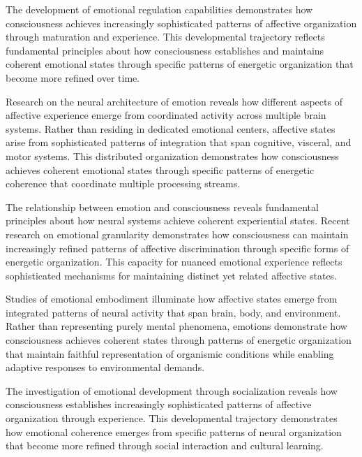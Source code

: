 The development of emotional regulation capabilities \cite{Siegel2012, amil2024theta} demonstrates how consciousness achieves increasingly sophisticated patterns of affective organization through maturation and experience. This developmental trajectory reflects fundamental principles about how consciousness establishes and maintains coherent emotional states through specific patterns of energetic organization that become more refined over time.

Research on the neural architecture of emotion \cite{Davidson2012, zheng2025unbearable} reveals how different aspects of affective experience emerge from coordinated activity across multiple brain systems. Rather than residing in dedicated emotional centers, affective states arise from sophisticated patterns of integration that span cognitive, visceral, and motor systems. This distributed organization demonstrates how consciousness achieves coherent emotional states through specific patterns of energetic coherence that coordinate multiple processing streams.

The relationship between emotion and consciousness reveals fundamental principles about how neural systems achieve coherent experiential states. Recent research on emotional granularity \cite{barrett2017emotions, da2024mathematical} demonstrates how consciousness can maintain increasingly refined patterns of affective discrimination through specific forms of energetic organization. This capacity for nuanced emotional experience reflects sophisticated mechanisms for maintaining distinct yet related affective states.

Studies of emotional embodiment \cite{Fuchs2019, pinotsis2023cytoelectric} illuminate how affective states emerge from integrated patterns of neural activity that span brain, body, and environment. Rather than representing purely mental phenomena, emotions demonstrate how consciousness achieves coherent states through patterns of energetic organization that maintain faithful representation of organismic conditions while enabling adaptive responses to environmental demands.

The investigation of emotional development through socialization \cite{Thompson2007, butlin2023consciousnessartificialintelligenceinsights} reveals how consciousness establishes increasingly sophisticated patterns of affective organization through experience. This developmental trajectory demonstrates how emotional coherence emerges from specific patterns of neural organization that become more refined through social interaction and cultural learning.

